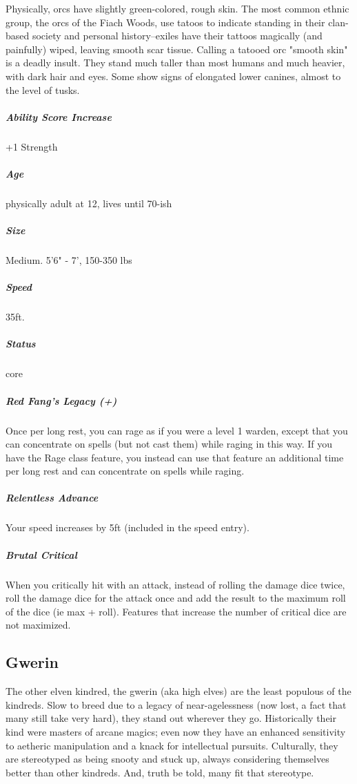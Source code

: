 Physically, orcs have slightly green-colored, rough skin. The most common ethnic group, the orcs of the Fiach Woods, use tatoos to indicate standing in their clan-based society and personal history--exiles have their tattoos magically (and painfully) wiped, leaving smooth scar tissue. Calling a tatooed orc "smooth skin" is a deadly insult. They stand much taller than most humans and much heavier, with dark hair and eyes. Some show signs of elongated lower canines, almost to the level of tusks.

\subparagraph*{Ability Score Increase}  +1 Strength

\subparagraph*{Age}  physically adult at 12, lives until 70-ish

\subparagraph*{Size}  Medium. 5'6" - 7', 150-350 lbs

\subparagraph*{Speed}  35ft.

\subparagraph*{Status}  core

\subparagraph*{Red Fang's Legacy (+)}  Once per long rest, you can rage as if you were a level 1 warden, except that you can concentrate on spells (but not cast them) while raging in this way. If you have the Rage class feature, you instead can use that feature an additional time per long rest and can concentrate on spells while raging.

\subparagraph*{Relentless Advance}  Your speed increases by 5ft (included in the speed entry).

\subparagraph*{Brutal Critical}  When you critically hit with an attack, instead of rolling the damage dice twice, roll the damage dice for the attack once and add the result to the maximum roll of the dice (ie max + roll). Features that increase the number of critical dice are not maximized.

\subsection{Gwerin} \label{lineage:gwerin}
The other elven kindred, the gwerin (aka high elves) are the least populous of the kindreds. Slow to breed due to a legacy of near-agelessness (now lost, a fact that many still take very hard), they stand out wherever they go. Historically their kind were masters of arcane magics; even now they have an enhanced sensitivity to aetheric manipulation and a knack for intellectual pursuits. Culturally, they are stereotyped as being snooty and stuck up, always considering themselves better than other kindreds. And, truth be told, many fit that stereotype.


